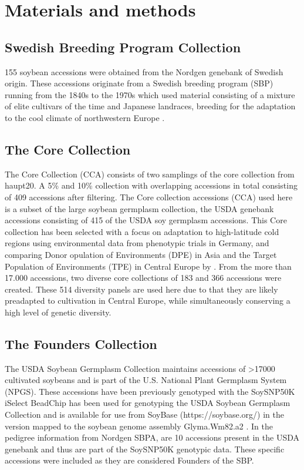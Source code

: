 \documentclass[9pt, onecolumn,twoside]{gsajnl}
\begin{document}
\section{Materials and methods}
\label{sec:materials:methods}

\subsection{Swedish Breeding Program Collection}
155 soybean accessions were obtained from the Nordgen genebank of Swedish origin. These accessions originate from a Swedish breeding program (SBP) running from the 1840s to the 1970s which used material consisting of a mixture of elite cultivars of the time and Japanese landraces, breeding for the adaptation to the cool climate of northwestern Europe \cite{holmberg1973}. 

\subsection{The Core Collection}
The Core Collection (CCA) consists of two samplings of the core collection from haupt20. A 5\% and 10\% collection with overlapping accessions in total consisting of 409 accessions after filtering. 
The Core collection accessions (CCA) used here is a subset of the large soybean germplasm collection, the  USDA genebank accessions consisting of 415 of the USDA soy germplasm accessions. This Core collection has been selected with a focus on adaptation to high-latitude cold regions using environmental data from phenotypic trials in Germany, and comparing Donor opulation of Environments (DPE) in Asia and the Target Population of Environments (TPE) in Central Europe by \cite{haupt20}. From the more than 17.000 accessions, two diverse core collections of 183 and 366 accessions were created. These 514 diversity panels are used here due to that they are likely preadapted to cultivation in Central Europe, while simultaneously conserving a high level of genetic diversity. 

\subsection{The Founders Collection}
The USDA Soybean Germplasm Collection maintains accessions of >17000 cultivated soybeans and is part of the U.S. National Plant Germplasm System (NPGS).  These accessions have been previously genotyped with the SoySNP50K iSelect BeadChip  \cite{song13,song15} has been used for genotyping the USDA Soybean Germplasm Collection and is available for use from SoyBase (https://soybase.org/) in the version mapped to the soybean genome assembly Glyma.Wm82.a2  \cite{schmutz10}. In the pedigree information from Nordgen SBPA, are 10 accessions present in the USDA genebank and thus are part of the SoySNP50K genotypic data. These specific accessions were included as they are considered Founders of the SBP. 
\end{document}
